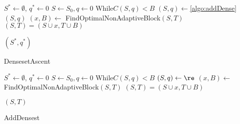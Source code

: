 \IncMargin{2em}
\begin{algorithm}[h]
	\LinesNumbered
	$S^*\gets\emptyset$, $q^*\gets 0$ 
	{
		$S\gets S_0, q\gets 0$
		While{$C(S,q)<B$}
		{
			$(S,q)\gets $\ref{algo:addDense}$(S,q)$
		}
		$(x,B)\gets$ FindOptimalNonAdaptiveBlock$(S,T)$
		$(S,T) = (S\cup x,T\cup B)$
	}

	\Return $(S^*,q^*)$
	\caption{DensesetAscent}\label{algo:denseAsc}
\end{algorithm}\DecMargin{1em}

\IncMargin{2em}
\begin{algorithm}[h]
	\LinesNumbered
	$S^*\gets\emptyset$, $q^*\gets 0$ 
	{
		$S\gets S_0, q\gets 0$
		While{$C(S,q)<B$}
		{
			$(S,q)\gets \re$
		}
		$(x,B)\gets$ FindOptimalNonAdaptiveBlock$(S,T)$
		$(S,T) = (S\cup x,T\cup B)$
	}

	\Return $(S,T)$
	\caption{AddDensest}\label{algo:addDense}
\end{algorithm}\DecMargin{1em}
